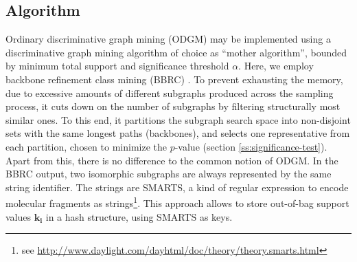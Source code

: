 \documentclass{sig-alternate}
\begin{document}
\subsection{Algorithm}
\label{s:Algorithm}
Ordinary discriminative graph mining (ODGM) may be 
implemented using a discriminative graph mining algorithm of choice as ``mother algorithm'', bounded 
by minimum total support and significance threshold $\alpha$. Here, we employ backbone refinement 
class mining (BBRC) \cite{maunz11efficient}. 
To prevent exhausting the memory, due to excessive amounts of different subgraphs produced
across the sampling process, it cuts down on the number of subgraphs by filtering structurally 
most similar ones. 
To this end, it partitions the subgraph search space into non-disjoint sets with the same 
longest paths (backbones), and selects one representative from each partition, chosen to 
minimize the $p$-value (section \ref{ss:significance-test}). 
Apart from this, there is no difference to the common notion of ODGM.
In the BBRC output, two isomorphic subgraphs are always represented by the same string identifier.
The strings are SMARTS, a kind of regular expression to encode molecular fragments as strings\footnote{see \url{http://www.daylight.com/dayhtml/doc/theory/theory.smarts.html}}. 
This approach allows to store out-of-bag support values $\mathbf{k_i}$ in a
hash structure, using SMARTS as keys. 
\end{document}
